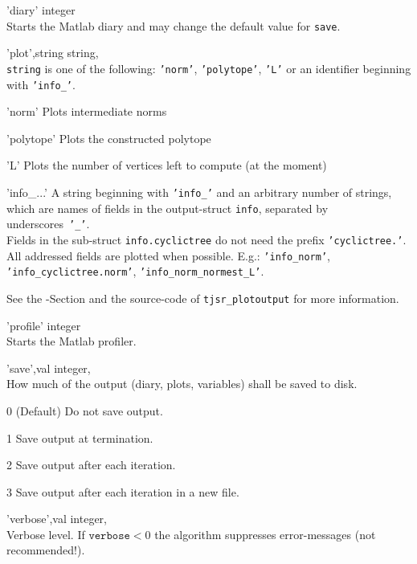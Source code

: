 \begin{param}
\item['diary'] integer\\Starts the Matlab diary and may change the default value for \texttt{save}.

\item['plot',string] string, \\
\texttt{string} is one of the following: \texttt{'norm'}, \texttt{'polytope'}, \texttt{'L'} or an identifier beginning with \texttt{'info\_'}. 
    \begin{param}
    \item['norm'] Plots intermediate norms
    \item['polytope'] Plots the constructed polytope
    \item['L'] Plots the number of vertices left to compute (at the moment)
    \item['info\_...'] A string beginning with \texttt{'info\_'} and an arbitrary number of strings, which are names of fields in the output-struct \texttt{info}, separated by underscores~\texttt{'\_'}. \\Fields in the sub-struct \texttt{info.cyclictree} do not need the prefix \texttt{'cyclictree.'}.
    All addressed fields are plotted when possible.
    E.g.: \texttt{'info\_norm'}, \texttt{'info\_cyclictree.norm'}, \texttt{'info\_norm\_normest\_L'}.
    \end{param}
    
    \item See the -Section and the source-code of \texttt{tjsr\_plotoutput} for more information.    
    
\item['profile'] integer\\Starts the Matlab profiler.    

\item['save',val] integer, \\How much of the output (diary, plots, variables) shall be saved to disk.
    \begin{param}
    \item[0] (Default) Do not save output.
    \item[1] Save output at termination.
    \item[2] Save output after each iteration.
    \item[3] Save output after each iteration in a new file.
    \end{param}
    
\item['verbose',val] integer, \\Verbose level. If $\texttt{verbose}<0$ the algorithm suppresses error-messages {\color{red}(not recommended!)}.
    
\end{param}


